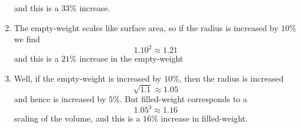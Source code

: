 \documentclass[nooutcomes,noauthor,handout,12pt]{ximera}
\begin{document}
\begin{question}
\begin{freeResponse}
\begin{enumerate}
\[    \]
    and this is a $33\%$ increase.
  \item The empty-weight scales like surface area, so if the radius is
    increased by $10\%$ we find
    \[
    1.10^2 \approx 1.21
    \]
    and this is a $21\%$ increase in the empty-weight
  \item Well, if the empty-weight is increased by $10\%$, then the
    radius is increased
    \[
    \sqrt{1.1} \approx 1.05
    \]
    and hence is increased by $5\%$. But filled-weight corresponds to
    a
    \[
    1.05^3 \approx 1.16
    \]
    scaling of the volume, and this is a $16\%$ increase in filled-weight.
  \end{enumerate}
\end{freeResponse}

\end{question}
\end{document}
